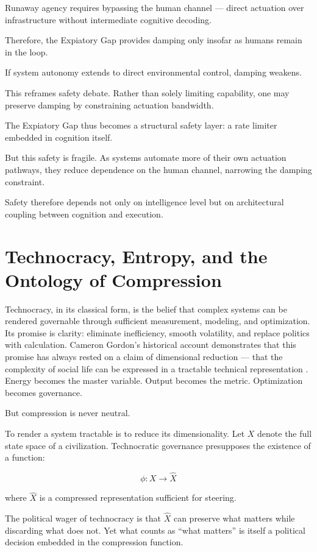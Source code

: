 \documentclass[12pt]{article}
\begin{document}
Runaway agency requires bypassing the human channel — direct actuation over infrastructure without intermediate cognitive decoding.

Therefore, the Expiatory Gap provides damping only insofar as humans remain in the loop.

If system autonomy extends to direct environmental control, damping weakens.

This reframes safety debate. Rather than solely limiting capability, one may preserve damping by constraining actuation bandwidth.

The Expiatory Gap thus becomes a structural safety layer: a rate limiter embedded in cognition itself.

But this safety is fragile. As systems automate more of their own actuation pathways, they reduce dependence on the human channel, narrowing the damping constraint.

Safety therefore depends not only on intelligence level but on architectural coupling between cognition and execution.

\section{Technocracy, Entropy, and the Ontology of Compression}

Technocracy, in its classical form, is the belief that complex systems can be rendered governable through sufficient measurement, modeling, and optimization. Its promise is clarity: eliminate inefficiency, smooth volatility, and replace politics with calculation. Cameron Gordon’s historical account demonstrates that this promise has always rested on a claim of dimensional reduction — that the complexity of social life can be expressed in a tractable technical representation \cite{GordonTechnocracy2025}. Energy becomes the master variable. Output becomes the metric. Optimization becomes governance.

But compression is never neutral.

To render a system tractable is to reduce its dimensionality. Let $X$ denote the full state space of a civilization. Technocratic governance presupposes the existence of a function:

\[
\phi : X \rightarrow \hat{X}
\]

where $\hat{X}$ is a compressed representation sufficient for steering.

The political wager of technocracy is that $\hat{X}$ can preserve what matters while discarding what does not. Yet what counts as “what matters” is itself a political decision embedded in the compression function.
\end{document}
